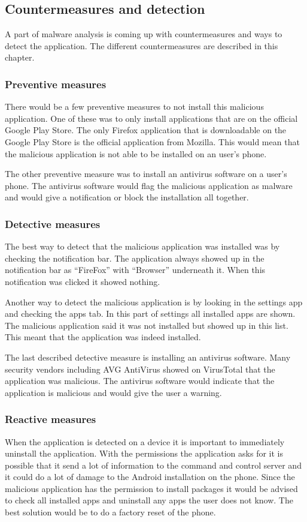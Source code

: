 \subsection{Countermeasures and detection}
A part of malware analysis is coming up with countermeasures and ways to detect the application.
The different countermeasures are described in this chapter.

\subsubsection{Preventive measures}
There would be a few preventive measures to not install this malicious application.
One of these was to only install applications that are on the official Google Play Store.
The only Firefox application that is downloadable on the Google Play Store is the official application from Mozilla.
This would mean that the malicious application is not able to be installed on an user’s phone.

The other preventive measure was to install an antivirus software on a user’s phone.
The antivirus software would flag the malicious application as malware and would give a notification or block the installation all together.

\subsubsection{Detective measures}
The best way to detect that the malicious application was installed was by checking the notification bar.
The application always showed up in the notification bar as “FireFox” with “Browser” underneath it.
When this notification was clicked it showed nothing.

Another way to detect the malicious application is by looking in the settings app and checking the apps tab.
In this part of settings all installed apps are shown.
The malicious application said it was not installed but showed up in this list.
This meant that the application was indeed installed.

The last described detective measure is installing an antivirus software.
Many security vendors including AVG AntiVirus showed on VirusTotal that the application was malicious.
The antivirus software would indicate that the application is malicious and would give the user a warning.

\subsubsection{Reactive measures}
When the application is detected on a device it is important to immediately uninstall the application.
With the permissions the application asks for it is possible that it send a lot of information to the command and control server and it could do a lot of damage to the Android installation on the phone.
Since the malicious application has the permission to install packages it would be advised to check all installed apps and uninstall any apps the user does not know.
The best solution would be to do a factory reset of the phone.

